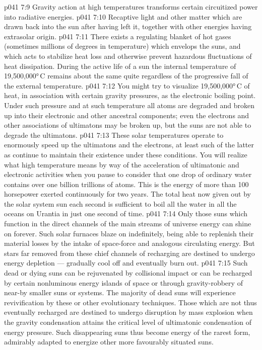 \vs p041 7:9 \bibnobreakspace Gravity action at high temperatures transforms certain circuitized power into radiative energies.
\vs p041 7:10 \bibnobreakspace Recaptive light and other matter which are drawn back into the sun after having left it, together with other energies having extrasolar origin.
\vs p041 7:11 \pc There exists a regulating blanket of hot gases (sometimes millions of degrees in temperature) which envelops the suns, and which acts to stabilize heat loss and otherwise prevent hazardous fluctuations of heat dissipation. During the active life of a sun the internal temperature of 19,500,000°\,C remains about the same quite regardless of the progressive fall of the external temperature.
\vs p041 7:12 \pc You might try to visualize 19,500,000°\,C of heat, in association with certain gravity pressures, as the electronic boiling point. Under such pressure and at such temperature all atoms are degraded and broken up into their electronic and other ancestral components; even the electrons and other associations of ultimatons may be broken up, but the suns are not able to degrade the ultimatons.
\vs p041 7:13 These solar temperatures operate to enormously speed up the ultimatons and the electrons, at least such of the latter as continue to maintain their existence under these conditions. You will realize what high temperature means by way of the acceleration of ultimatonic and electronic activities when you pause to consider that one drop of ordinary water contains over one billion trillions of atoms. This is the energy of more than 100 horsepower exerted continuously for two years. The total heat now given out by the solar system sun each second is sufficient to boil all the water in all the oceans on Urantia in just one second of time.
\vs p041 7:14 \pc Only those suns which function in the direct channels of the main streams of universe energy can shine on forever. Such solar furnaces blaze on indefinitely, being able to replenish their material losses by the intake of space\hyp{}force and analogous circulating energy. But stars far removed from these chief channels of recharging are destined to undergo energy depletion --- gradually cool off and eventually burn out.
\vs p041 7:15 Such dead or dying suns can be rejuvenated by collisional impact or can be recharged by certain nonluminous energy islands of space or through gravity\hyp{}robbery of near\hyp{}by smaller suns or systems. The majority of dead suns will experience revivification by these or other evolutionary techniques. Those which are not thus eventually recharged are destined to undergo disruption by mass explosion when the gravity condensation attains the critical level of ultimatonic condensation of energy pressure. Such disappearing suns thus become energy of the rarest form, admirably adapted to energize other more favourably situated suns.
